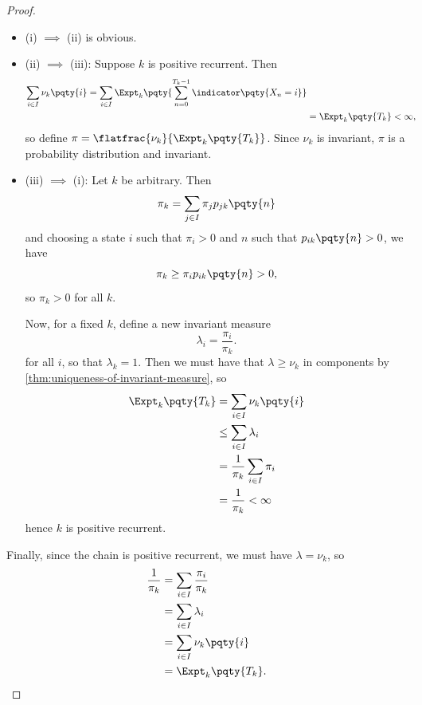 \begin{proof}
    \begin{itemize}
        \item (i) \(\implies\) (ii) is obvious.
        \item (ii) \(\implies\) (iii): Suppose \(k\) is positive recurrent. Then
        \begin{align*}
            \sum_{i \in I} \nu_k \pqty{i} = \sum_{i \in I} \Expt_k \pqty{\sum_{n = 0}^{T_k - 1} \indicator\pqty{X_n = i}} \\
            &= \Expt_k \pqty{T_k} < \infty,
        \end{align*}
        so define \(\pi = \flatfrac{\nu_k}{\Expt_k \pqty{T_k}}\). Since \(\nu_k\) is invariant, \(\pi\) is a probability distribution and invariant.
        \item (iii) \(\implies\) (i): Let \(k\) be arbitrary. Then
        \[
            \pi_k = \sum_{j \in I} \pi_j p_{jk} \pqty{n}
        \]
        and choosing a state \(i\) such that \(\pi_i > 0\) and \(n\) such that \(p_{ik} \pqty{n} > 0\), we have
        \[
            \pi_k \geq \pi_i p_{ik} \pqty{n} > 0,
        \]
        so \(\pi_k > 0\) for all \(k\).

        Now, for a fixed \(k\), define a new invariant measure
        \[
            \lambda_i = \frac{\pi_i}{\pi_k}.
        \]
        for all \(i\), so that \(\lambda_k = 1\). Then we must have that \(\lambda \geq \nu_k\) in components by \autoref{thm:uniqueness-of-invariant-measure}, so
        \begin{align*}
            \Expt_k\pqty{T_k} &= \sum_{i \in I} \nu_k \pqty{i} \\
            &\leq \sum_{i \in I} \lambda_i \\
            &= \frac{1}{\pi_k} \sum_{i \in I} \pi_i \\
            &= \frac{1}{\pi_k} < \infty
        \end{align*}
        hence \(k\) is positive recurrent.
    \end{itemize}

    Finally, since the chain is positive recurrent, we must have \(\lambda = \nu_k\), so
    \begin{align*}
        \frac{1}{\pi_k} &= \sum_{i \in I} \frac{\pi_i}{\pi_k} \\
        &= \sum_{i \in I} \lambda_i \\
        &= \sum_{i \in I} \nu_k \pqty{i} \\
        &= \Expt_k \pqty{T_k}.
    \end{align*}
\end{proof}

